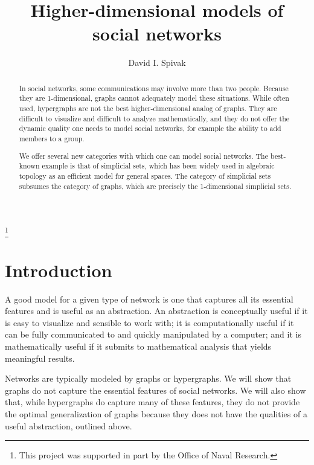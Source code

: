 \documentclass{amsart}
\begin{document}
\setcounter{tocdepth}{1}

\begin{abstract}

In social networks, some communications may involve more than two people.  Because they are 1-dimensional, graphs cannot adequately model these situations.  While often used, hypergraphs are not the best higher-dimensional analog of graphs.  They are difficult to visualize and difficult to analyze mathematically, and they do not offer the dynamic quality one needs to model social networks, for example the ability to add members to a group.  

We offer several new categories with which one can model social networks.  The best-known example is that of simplicial sets, which has been widely used in algebraic topology as an efficient model for general spaces.  The category of simplicial sets subsumes the category of graphs, which are precisely the 1-dimensional simplicial sets.

\end{abstract}

\author{David I. Spivak}

\title{Higher-dimensional models of social networks}

\thanks{This project was supported in part by the Office of Naval Research.}

\maketitle

\tableofcontents

\section{Introduction}

A good model for a given type of network is one that captures all its essential features and is useful as an abstraction.  An abstraction is conceptually useful if it is easy to visualize and sensible to work with; it is computationally useful if it can be fully communicated to and quickly manipulated by a computer; and it is mathematically useful if it submits to mathematical analysis that yields meaningful results.

Networks are typically modeled by graphs or hypergraphs.  We will show that graphs do not capture the essential features of social networks.  We will also show that, while hypergraphs do capture many of these features, they do not provide the optimal generalization of graphs because they does not have the qualities of a useful abstraction, outlined above.  
\end{document}
